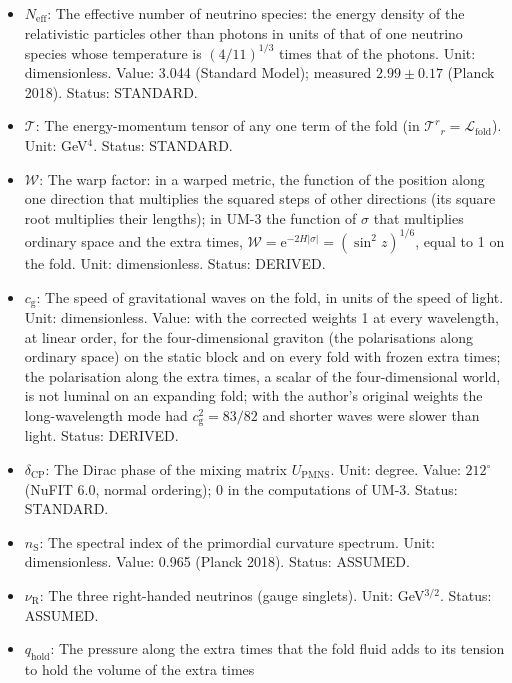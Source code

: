 \documentclass[
  10pt,
]{article}
\providecommand{\tightlist}{%
  \setlength{\itemsep}{0pt}\setlength{\parskip}{0pt}}
\begin{document}
\begin{itemize}
\tightlist
\item
  \(N_{\mathrm{eff}}\): The effective number of neutrino species: the
  energy density of the relativistic particles other than photons in
  units of that of one neutrino species whose temperature is
  \((4/11)^{1/3}\) times that of the photons. Unit: dimensionless.
  Value: 3.044 (Standard Model); measured \(2.99 \pm 0.17\) (Planck
  2018). Status: STANDARD.
\item
  \(\mathcal{T}\): The energy-momentum tensor of any one term of the
  fold (in \(\mathcal{T}^r{}_r = \mathcal{L}_{\mathrm{fold}}\)). Unit:
  GeV\(^4\). Status: STANDARD.
\item
  \(\mathcal{W}\): The warp factor: in a warped metric, the function of
  the position along one direction that multiplies the squared steps of
  other directions (its square root multiplies their lengths); in UM-3
  the function of \(\sigma\) that multiplies ordinary space and the
  extra times,
  \(\mathcal{W} = \mathrm{e}^{-2H\lvert\sigma\rvert} = (\sin^2z)^{1/6}\),
  equal to 1 on the fold. Unit: dimensionless. Status: DERIVED.
\item
  \(c_{\mathrm{g}}\): The speed of gravitational waves on the fold, in
  units of the speed of light. Unit: dimensionless. Value: with the
  corrected weights 1 at every wavelength, at linear order, for the
  four-dimensional graviton (the polarisations along ordinary space) on
  the static block and on every fold with frozen extra times; the
  polarisation along the extra times, a scalar of the four-dimensional
  world, is not luminal on an expanding fold; with the author's original
  weights the long-wavelength mode had \(c_{\mathrm{g}}^2 = 83/82\) and
  shorter waves were slower than light. Status: DERIVED.
\item
  \(\delta_{\mathrm{CP}}\): The Dirac phase of the mixing matrix
  \(U_{\mathrm{PMNS}}\). Unit: degree. Value: \(212^\circ\) (NuFIT 6.0,
  normal ordering); 0 in the computations of UM-3. Status: STANDARD.
\item
  \(n_{\mathrm{S}}\): The spectral index of the primordial curvature
  spectrum. Unit: dimensionless. Value: 0.965 (Planck 2018). Status:
  ASSUMED.
\item
  \(\nu_{\mathrm{R}}\): The three right-handed neutrinos (gauge
  singlets). Unit: GeV\(^{3/2}\). Status: ASSUMED.
\item
  \(q_{\mathrm{hold}}\): The pressure along the extra times that the
  fold fluid adds to its tension to hold the volume of the extra times

\end{itemize}
\end{document}
